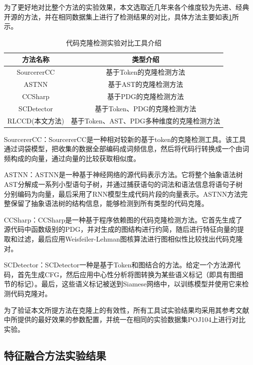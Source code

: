 为了更好地对比整个方法的实验效果，本文选取近几年来各个维度较为先进、经典开源的方法，并在相同数据集上进行了检测结果的对比，具体方法主要如表\ref{tab:tool}所示。

\begin{table}[htp]
  \centering
  \caption{代码克隆检测实验对比工具介绍} 
  \label{tab:tool}
  \renewcommand{\arraystretch}{1.1}
  \begin{tabular*}{0.8\textwidth}{@{\extracolsep{\fill}}cc}
  \toprule
    方法名称			&类型介绍		\\
  \midrule
  SourcererCC		 &基于Token的克隆检测方法 \\
  ASTNN			     &基于AST的克隆检测方法 \\
  CCSharp		     &基于PDG的克隆检测方法 \\
  SCDetector		 &基于Token、PDG的克隆检测方法 \\
  RLCCD(本文方法)	&基于Token、AST、PDG多种维度的克隆检测方法 \\
  \bottomrule
  \end{tabular*}
\end{table}

SourcererCC\cite{7886988}：SourcererCC是一种相对较新的基于token的克隆检测工具。该工具通过词袋模型，把收集的数据全部编码成词频信息，然后将代码行转换成一个由词频构成的向量，通过向量的比较获取相似度。

ASTNN\cite{8812062}：ASTNN是一种基于神经网络的源代码表示方法。它将整个抽象语法树AST分解成一系列小型语句子树，并通过捕获语句的词法和语法信息将语句子树分别编码为向量，最后采用了RNN模型生成代码片段的向量表示。ASTNN方法完整保留了抽象语法树的结构信息，能够检测到所有类型的代码克隆。

CCSharp\cite{9286111}：CCSharp是一种基于程序依赖图的代码克隆检测方法。它首先生成了源代码中函数级别的PDG，并对生成的图结构进行约简，随后进行特征向量的提取和过滤，最后应用Weisfeiler-Lehman图核算法进行图相似性比较找出代码克隆对。

SCDetector\cite{10.1145/3324884.3416562}：SCDetector一种是基于Token和图结合的方法。给定一个方法源代码，首先生成CFG，然后应用中心性分析将图转换为某些语义标记（即具有图细节的标记）。最后，这些语义标记被送到Siamese网络中，以训练模型并使用它来检测代码克隆对。

为了验证本文所提方法在克隆上的有效性，所有工具试实验结果均采用其参考文献中所提供的最好效果的参数配置，并统一在相同的实验数据集POJ104上进行对比实验。

\subsection{特征融合方法实验结果}



